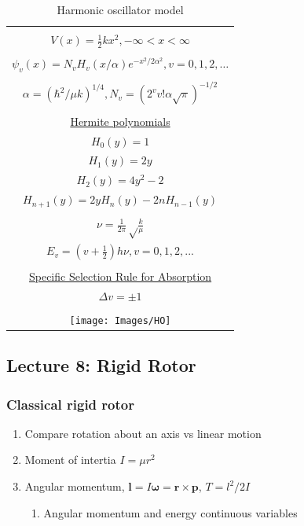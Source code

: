 \documentclass[11pt]{article}
\begin{document}
\begin{table}[]
   \begin{center}
   \caption{Harmonic oscillator model}
    \label{Harmonic-oscillator}
\begin{tabular}[H]{|c|}
\hline
 \\
$\displaystyle       V(x) = \frac{1}{2} k x^2, -\infty < x < \infty $ \\
 \\
$\displaystyle     \psi_v(x) = N_v H_v(x/\alpha)e^{-x^2/2\alpha^2}, v = 0, 1, 2, \ldots $ \\
\\
$\displaystyle \alpha=(\hbar^2/\mu k)^{1/4}, N_v=(2^vv!\alpha\sqrt{\pi})^{-1/2} $ \\
 \\
\underline{Hermite polynomials} \\
$\displaystyle H_0(y) =1$\\
$\displaystyle H_1(y) = 2y$\\
$\displaystyle H_2(y) = 4y^2-2$\\
$\displaystyle H_{n+1}(y) = 2 y H_n(y) -2 n H_{n-1}(y)$\\
 \\
$\displaystyle     \nu =\frac{1}{2\pi}\sqrt\frac{k}{\mu}$ \\
$\displaystyle     E_v=(v+\frac{1}{2})h \nu, v=0, 1, 2, ...$ \\

\\ \underline{Specific Selection Rule for Absorption} \\
$\displaystyle \Delta v = \pm 1$
 \\
 \\
     \texttt{[image: Images/HO]} \\       
\hline
\end{tabular}
 \end{center}
\end{table}
\subsection{Lecture 8: Rigid Rotor}
\label{sec:orge404385}
\subsubsection{Classical rigid rotor}
\label{sec:org8749773}
\begin{enumerate}
\item Compare rotation about an axis vs linear motion
\item Moment of intertia \(I=\mu r^2\)
\item Angular momentum, \(\mathbf{l} = I \mathbf{\omega} = \mathbf{r}\times \mathbf{p}\), \(T= l^2/2I\) 
\begin{enumerate}
\item Angular momentum and energy continuous variables
\end{enumerate}
\end{enumerate}
\end{document}
